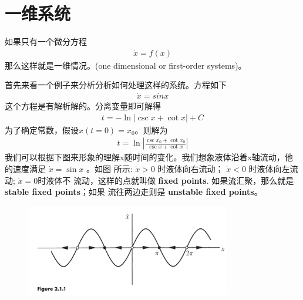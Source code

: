 \section{一维系统}
如果只有一个微分方程
\begin{equation}
    \begin{aligned} 
    \dot{x} = f(x)
    \end{aligned} 
\end{equation}
那么这样就是一维情况。(one dimensional or first-order systems)。
\par 首先来看一个例子来分析分析如何处理这样的系统。方程如下
\begin{equation}
    \begin{aligned} 
    \dot{x} = sin x
    \end{aligned} 
\end{equation}
这个方程是有解析解的。分离变量即可解得
\begin{equation}
    \begin{aligned} 
    t = -\ln |\csc x + \cot x| + C
    \end{aligned} 
\end{equation}
为了确定常数，假设$x(t=0) = x_0$。则解为
\begin{equation}
    \begin{aligned} 
    t = \ln \left| \frac{\csc x_0 + \cot x_0}{\csc x + \cot x}\right|
    \end{aligned} 
\end{equation}
我们可以根据下图来形象的理解x随时间的变化。我们想象液体沿着x轴流动，他的速度满足 $ \dot{x} = \sin x $ 。如图
所示: $ \dot{x} > 0 $ 时液体向右流动； $ \dot{x}  < 0$ 时液体向左流动; $ \dot{x} = 0 $时液体不
流动，这样的点就叫做 \textbf{fixed points}. 如果流汇聚，那么就是 \textbf{stable fixed points}；如果
流往两边走则是 \textbf{unstable fixed points}。
\begin{figure}[htbp]
    \centering
    \includegraphics[width=0.8\textwidth]{figures/1-1.png}
    \caption{}
\end{figure}

